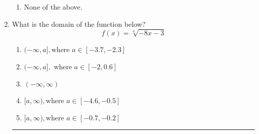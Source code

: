 \documentclass[14pt]{extbook}
\newcommand{\litem}[1]{\item#1\hspace*{-1cm}\rule{\textwidth}{0.4pt}}
\begin{document}
\begin{enumerate}
{\begin{enumerate}[label=\Alph*.]
\item None of the above.
\end{enumerate} }
\litem{
What is the domain of the function below?\[ f(x) = \sqrt[4]{-8 x - 3} \]\begin{enumerate}[label=\Alph*.]
\item \( (-\infty, a], \text{where } a \in [-3.7, -2.3] \)
\item \( (-\infty, a], \text{ where } a \in [-2, 0.6] \)
\item \( (-\infty, \infty) \)
\item \( [a, \infty), \text{where } a \in [-4.6, -0.5] \)
\item \( [a, \infty), \text{where } a \in [-0.7, -0.2] \)


\end{enumerate}}
\end{enumerate}
\end{document}
